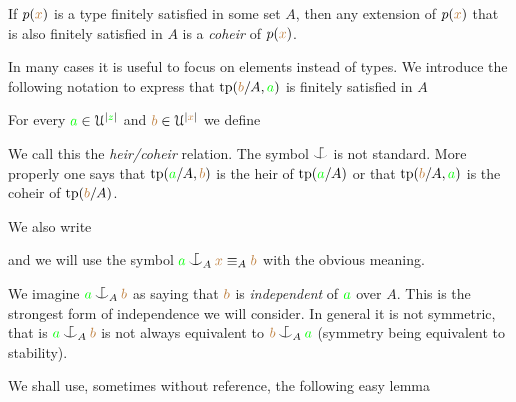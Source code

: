 \documentclass[creche.tex]{subfiles}
\begin{document}
If $p({\color{brown} x})$ is a type finitely satisfied in some set $A$, then any extension of $p({\color{brown} x})$ that is also finitely satisfied in $A$ is a \emph{coheir\/} of $p({\color{brown} x})$.

In many cases it is useful to focus on elements instead of types.
We introduce the following notation to express that ${\rm tp}({\color{brown} b}/A,{\color{green} a})$ is finitely satisfied in $A$

\begin{definition}\label{def_coheir_idepencence} For every ${\color{green} a}\in\EuScript U^{|{\color{green} z}|}$ and ${\color{brown} b}\in\EuScript U^{|{\color{brown} x}|}$ we define

\noindent\llap{\textcolor{red}{\Large\danger}\kern1.5ex}%


We call this the \emph{heir/coheir} relation.
The symbol $\nonforkc$ is not standard.
More properly one says that ${\rm tp}({\color{green} a}/A,{\color{brown} b})$ is the heir of ${\rm tp}({\color{green} a}/A)$ or that ${\rm tp}({\color{brown} b}/A,{\color{green} a})$ is the coheir of ${\rm tp}({\color{brown} b}/A)$.

We also write


and we will use the symbol \emph{${\gr a}\nonforkc_A{\mr x}\equiv_A{\mr b}$} with the obvious meaning.\QED
\end{definition}

We imagine ${\gr a}\nonforkc_A{\mr b}$ as saying that ${\color{brown} b}$ is \emph{independent\/} of ${\color{green} a}$ over $A$.
This is the strongest form of independence we will consider.
In general it is not symmetric, that is ${\gr a}\nonforkc_A{\mr b}$ is not always equivalent to ${\mr b}\nonforkc_A{\gr a}$ (symmetry being equivalent to stability).

We shall use, sometimes without reference, the following easy lemma
\end{document}
